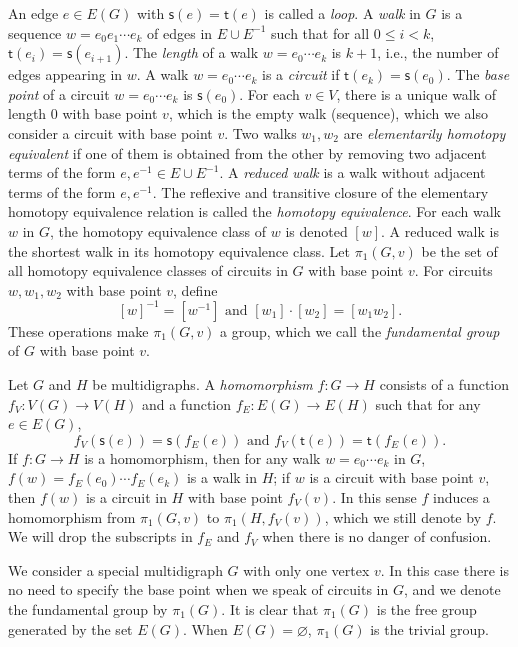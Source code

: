 \documentclass[10pt,a4paper]{amsart}
\theoremstyle{definition}
\theoremstyle{definition}
\numberwithin{equation}{section}
\begin{document}
An edge $e\in E(G)$ with $\mathsf{s}(e)=\mathsf{t}(e)$ is called a {\em loop}. A {\em walk} in $G$ is a sequence $w=e_0e_1\cdots e_k$ of edges in $E\cup E^{-1}$ such that for all $0\leq i<k$, $\mathsf{t}(e_i)=\mathsf{s}(e_{i+1})$. The {\em length} of a walk $w=e_0\cdots e_k$ is $k+1$, i.e., the number of edges appearing in $w$. A walk $w=e_0 \cdots e_k$ is a {\em circuit} if $\mathsf{t}(e_k)=\mathsf{s}(e_0)$. The {\em base point} of a circuit $w=e_0\cdots e_k$ is $\mathsf{s}(e_0)$. For each $v\in V$, there is a unique walk of length $0$ with base point $v$, which is the empty walk (sequence), which we also consider a circuit with base point $v$. Two walks $w_1, w_2$ are {\em elementarily homotopy equivalent} if one of them is obtained from the other by removing two adjacent terms of the form $e, e^{-1}\in E\cup E^{-1}$. A {\em reduced walk} is a walk without adjacent terms of the form $e, e^{-1}$. The reflexive and transitive closure of the elementary homotopy equivalence relation is called the {\em homotopy equivalence}. For each walk $w$ in $G$, the homotopy equivalence class of $w$ is denoted $[w]$. A reduced walk is the shortest walk in its homotopy equivalence class. Let $\pi_1(G, v)$ be the set of all homotopy equivalence classes of  circuits in $G$ with base point $v$. For circuits $w, w_1, w_2$ with base point $v$, define
$$ [w]^{-1}=[w^{-1}] \mbox{ and } [w_1]\cdot[w_2]=[w_1w_2]. $$
These operations make $\pi_1(G, v)$ a group, which we call the {\em fundamental group} of $G$ with base point $v$.

Let $G$ and $H$ be multidigraphs. A {\em homomorphism} $f\colon G\to H$ consists of a function $f_V\colon V(G)\to V(H)$ and a function $f_E\colon E(G)\to E(H)$ such that for any $e\in E(G)$, 
$$ f_V(\mathsf{s}(e))=\mathsf{s}(f_E(e)) \mbox{ and } f_V(\mathsf{t}(e))=\mathsf{t}(f_E(e)). $$
If $f\colon G\to H$ is a homomorphism, then for any walk $w=e_0\cdots e_k$ in $G$, $f(w)=f_E(e_0)\cdots f_E(e_k)$ is a walk in $H$; if $w$ is a circuit with base point $v$, then $f(w)$ is a circuit in $H$ with base point $f_V(v)$. In this sense $f$ induces a homomorphism from $\pi_1(G, v)$ to $\pi_1(H, f_V(v))$, which we still denote by $f$. We will drop the subscripts in $f_E$ and $f_V$ when there is no danger of confusion.

We consider a special multidigraph $G$ with only one vertex $v$. In this case there is no need to specify the base point when we speak of circuits in $G$, and we denote the fundamental group by $\pi_1(G)$. It is clear that $\pi_1(G)$ is the free group generated by the set $E(G)$. When $E(G)=\varnothing$, $\pi_1(G)$ is the trivial group. 
\end{document}
